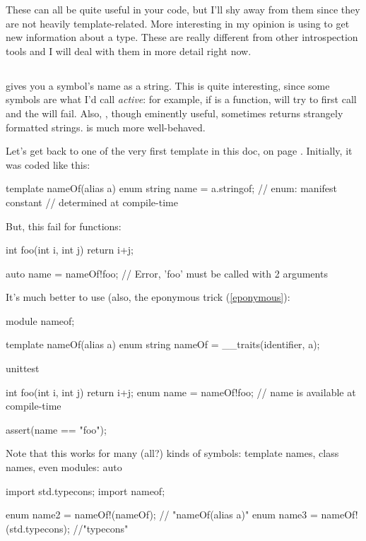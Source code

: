These can all be quite useful in your code, but I'll shy away from them since they are not heavily template-related. More interesting in my opinion is using  to get new information about a type. These are really different from other introspection tools and I will deal with them in more detail right now.

\subsection{}

 gives you a symbol's name as a string. This is quite interesting, since some symbols are what I'd call \emph{active}: for example, if  is a function,  will try to first call  and the  will fail. Also, , though eminently useful, sometimes returns strangely formatted strings.  is much more well-behaved.

Let's get back to one of the very first template in this doc,  on page \pageref{templatedeclarationexamples}. Initially, it was coded like this:

\begin{dcode}
template nameOf(alias a)
{
    enum string name = a.stringof; // enum: manifest constant
                                   // determined at compile-time
}
\end{dcode}

But, this fail for functions:

\begin{dcode}
int foo(int i, int j) { return i+j;}

auto name = nameOf!foo; // Error, 'foo' must be called with 2 arguments
\end{dcode}

It's much better to use  (also, the eponymous trick (\ref{eponymous}):

\begin{dcode}
module nameof;

template nameOf(alias a)
{
    enum string nameOf = __traits(identifier, a);
}

unittest
{
    int foo(int i, int j) { return i+j;}
    enum name = nameOf!foo; // name is available at compile-time

    assert(name == "foo");
}
\end{dcode}

Note that this works for many (all?) kinds of symbols: template names, class names, even modules:
auto
\begin{dcode}
import std.typecons;
import nameof;

enum name2 = nameOf!(nameOf); // "nameOf(alias a)"
enum name3 = nameOf!(std.typecons); //"typecons"
\end{dcode}

